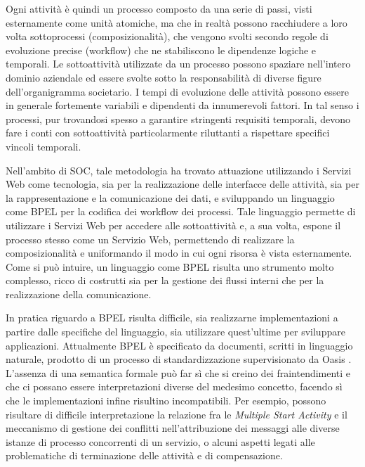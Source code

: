 Ogni attività è quindi un processo composto da una serie di passi, visti
esternamente come unità atomiche, ma che in realtà possono racchiudere a loro
volta sottoprocessi (composizionalità), che vengono svolti secondo regole di
evoluzione precise (workflow) che ne stabiliscono le dipendenze logiche e
temporali. Le sottoattività utilizzate da un processo possono spaziare
nell'intero dominio aziendale ed essere svolte sotto la responsabilità di diverse
figure dell'organigramma societario. I tempi di evoluzione delle attività possono
essere in generale fortemente variabili e dipendenti da innumerevoli fattori. In
tal senso i processi, pur trovandosi spesso a garantire stringenti requisiti
temporali, devono fare i conti con sottoattività particolarmente riluttanti a
rispettare specifici vincoli temporali.

Nell'ambito di SOC, tale metodologia ha trovato attuazione
utilizzando i Servizi Web come tecnologia, sia per la realizzazione delle interfacce delle
attività, sia per la rappresentazione e la comunicazione dei dati, e
sviluppando un linguaggio come BPEL \cite{BPEL11Spec} per la codifica dei
workflow dei processi. Tale linguaggio permette di utilizzare i Servizi Web per
accedere alle sottoattività e, a sua volta, espone il processo stesso come un Servizio Web,
permettendo di realizzare la composizionalità e uniformando il modo in cui ogni
risorsa è vista esternamente. Come si può intuire, un linguaggio come
BPEL risulta uno strumento molto complesso, ricco di costrutti sia per la gestione
dei flussi interni che per la realizzazione della comunicazione.

In pratica riguardo a BPEL risulta difficile, sia realizzarne implementazioni a
partire dalle specifiche del linguaggio, sia utilizzare quest'ultime per
sviluppare applicazioni. Attualmente BPEL è specificato da documenti, scritti in
linguaggio naturale, prodotto di un processo di standardizzazione supervisionato
da Oasis \cite{OASISSite}. L'assenza di una semantica formale può far sì che si
creino dei fraintendimenti e che ci possano essere interpretazioni diverse del
medesimo concetto, facendo sì che le implementazioni infine risultino
incompatibili. Per esempio, possono risultare di difficile interpretazione la
relazione fra le \emph{Multiple Start Activity} e il meccanismo di gestione dei
conflitti nell'attribuzione dei messaggi alle diverse istanze di processo
concorrenti di un servizio, o alcuni aspetti legati alle problematiche di
terminazione delle attività e di compensazione.

